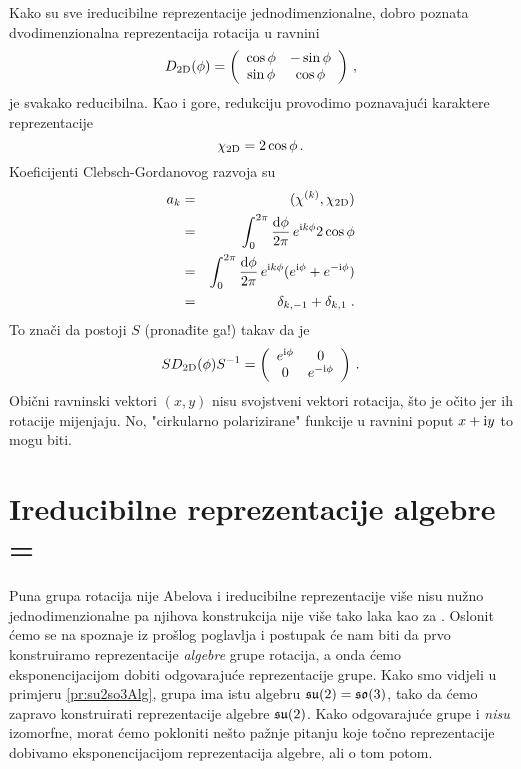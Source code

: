 Kako su sve ireducibilne reprezentacije jednodimenzionalne,
dobro poznata dvodimenzionalna reprezentacija rotacija u ravnini
\begin{equation}        
 D_{\rm 2D} (\phi) = \left( 
\begin{array}{cc}        
\cos\phi & -\sin\phi \\
\sin\phi & \cos\phi
\end{array}                
\right) \,, 
\end{equation}
je svakako reducibilna. Kao i gore, redukciju provodimo
poznavajući karaktere reprezentacije
\begin{equation}
    \chi_{\rm 2D}=2\cos\phi \,.
\end{equation}
Koeficijenti Clebsch-Gordanovog razvoja su
\begin{eqnarray*}
a_k & = & (\chi^{(k)}, \chi_{\rm 2D}) \\
    & = & \int_{0}^{2\pi}\frac{\textrm{d} \phi}{2\pi}\,
   e^{\textrm{\scriptsize i} k \phi} 2\cos\phi  \\
 & = & \int_{0}^{2\pi}\frac{\textrm{d} \phi}{2\pi}\,
  e^{\textrm{\scriptsize i} k \phi} ( e^{\textrm{\scriptsize i}  \phi} + e^{-\textrm{\scriptsize i}  \phi}) \\
 & = & \delta_{k,-1} + \delta_{k, 1} \;.
\end{eqnarray*}
To znači da postoji $S$ (pronađite ga!) takav da je
\begin{equation}
  S D_{\rm 2D} (\phi) S^{-1} = \left(
\begin{array}{cc}        
e^{\textrm{\scriptsize i}  \phi} &  0 \\
0 & e^{- \textrm{\scriptsize i}  \phi}
\end{array}                
\right) \,.
\end{equation}
Obični ravninski vektori $(x, y)$ nisu svojstveni vektori
rotacija, što je očito jer ih rotacije mijenjaju. No, "cirkularno
polarizirane" funkcije u ravnini poput $x + \textrm{i} y$ to mogu biti.


\section{Ireducibilne reprezentacije algebre  = }

Puna grupa rotacija  nije Abelova i ireducibilne
reprezentacije više nisu nužno jednodimenzionalne pa njihova konstrukcija nije
više tako laka kao za .
Oslonit ćemo se na spoznaje iz prošlog poglavlja i
postupak će nam biti da prvo konstruiramo
reprezentacije  \emph{algebre} grupe rotacija, a onda
ćemo eksponencijacijom dobiti odgovarajuće reprezentacije grupe.
Kako smo vidjeli u primjeru \ref{pr:su2so3Alg}, grupa 
ima istu algebru $\mathfrak{su}(2)=\mathfrak{so}(3)$, tako da ćemo zapravo
konstruirati reprezentacije algebre $\mathfrak{su}(2)$. Kako odgovarajuće
grupe  i  \emph{nisu} izomorfne, morat ćemo pokloniti
nešto pažnje pitanju koje točno reprezentacije dobivamo eksponencijacijom
reprezentacija algebre, ali o tom potom.

